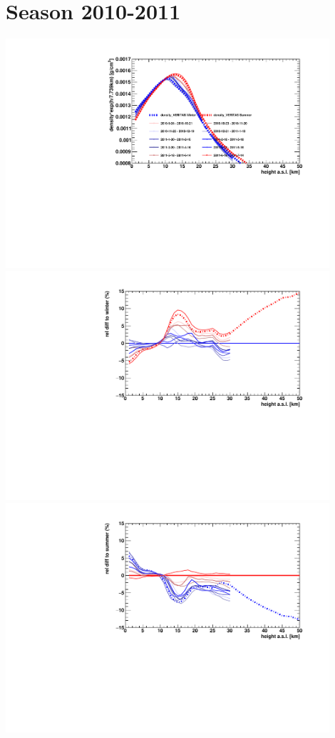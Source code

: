 \section*{Season 2010-2011}
\noindent\begin{minipage}{\textwidth}
\centering
\includegraphics[width=0.9\textwidth]{season-2010-2011-density.pdf}
\includegraphics[width=0.9\textwidth]{season-relativeWinter-2010-2011-density.pdf}
\includegraphics[width=0.9\textwidth]{season-relativeSummer-2010-2011-density.pdf}
\end{minipage}
